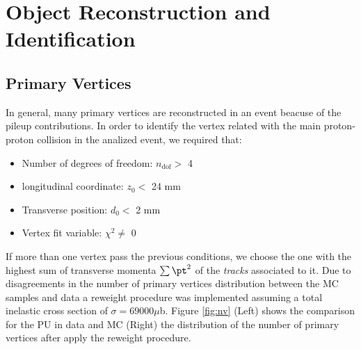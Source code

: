 \chapter{Object Reconstruction and Identification}\label{obj_reco_id}

\section{Primary Vertices}

In general, many primary vertices are reconstructed in an event beacuse of the pileup contributions. In order to identify the vertex related with the main proton-proton collision in the analized event,  we required that:

\begin{itemize}
\item
Number of degrees of freedom:  $n_{\text{dof}} >$ 4
\item
longitudinal coordinate: $z_{0} <$ 24 mm
\item
Transverse position: $d_{0}<$ 2 mm 
\item
Vertex fit variable: $\chi^{2} \neq$ 0
\end{itemize}

If more than one vertex pass the previous conditions, we choose the one with the highest sum of transverse momenta $\sum \pt^{2}$ of the \emph{tracks} associated to it. 
Due to disagreements in the number of primary vertices distribution  between the MC samples and data a reweight procedure was implemented assuming a total inelastic cross section of $\sigma = 69 000 \mu$b. Figure \ref{fig:nv} (Left) shows the comparison for the PU in data and MC (Right) the distribution of the number of primary vertices after apply the reweight procedure. 

